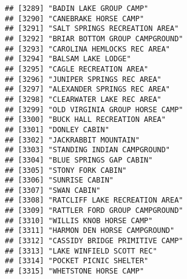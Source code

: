 \documentclass[
]{article}
\begin{document}
\begin{verbatim}
## [3289] "BADIN LAKE GROUP CAMP"                                                               
## [3290] "CANEBRAKE HORSE CAMP"                                                                
## [3291] "SALT SPRINGS RECREATION AREA"                                                        
## [3292] "BRIAR BOTTOM GROUP CAMPGROUND"                                                       
## [3293] "CAROLINA HEMLOCKS REC AREA"                                                          
## [3294] "BALSAM LAKE LODGE"                                                                   
## [3295] "CAGLE RECREATION AREA"                                                               
## [3296] "JUNIPER SPRINGS REC AREA"                                                            
## [3297] "ALEXANDER SPRINGS REC AREA"                                                          
## [3298] "CLEARWATER LAKE REC AREA"                                                            
## [3299] "OLD VIRGINIA GROUP HORSE CAMP"                                                       
## [3300] "BUCK HALL RECREATION AREA"                                                           
## [3301] "DONLEY CABIN"                                                                        
## [3302] "JACKRABBIT MOUNTAIN"                                                                 
## [3303] "STANDING INDIAN CAMPGROUND"                                                          
## [3304] "BLUE SPRINGS GAP CABIN"                                                              
## [3305] "STONY FORK CABIN"                                                                    
## [3306] "SUNRISE CABIN"                                                                       
## [3307] "SWAN CABIN"                                                                          
## [3308] "RATCLIFF LAKE RECREATION AREA"                                                       
## [3309] "RATTLER FORD GROUP CAMPGROUND"                                                       
## [3310] "WILLIS KNOB HORSE CAMP"                                                              
## [3311] "HARMON DEN HORSE CAMPGROUND"                                                         
## [3312] "CASSIDY BRIDGE PRIMITIVE CAMP"                                                       
## [3313] "LAKE WINFIELD SCOTT REC"                                                             
## [3314] "POCKET PICNIC SHELTER"                                                               
## [3315] "WHETSTONE HORSE CAMP"                                                                

\end{verbatim}
\end{document}
